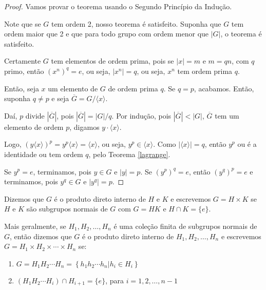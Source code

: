 	\begin{proof}
		Vamos provar o teorema usando o Segundo Princípio da Indução. 
		\par\vspace{0.3cm} Note que se $G$ tem ordem 2, nosso teorema é satisfeito. Suponha que $G$ tem ordem maior que 2 e que para todo grupo com ordem menor que $|G|$, o teorema é satisfeito. 
		\par\vspace{0.3cm} Certamente $G$ tem elementos de ordem prima, pois se $|x| = m$ e $m = qn$, com $q$ primo, então $(x^n)^q = e$, ou seja, $|x^n| = q$, ou seja, $x^n$ tem ordem prima $q$.
		\par\vspace{0.3cm} Então, seja $x$ um elemento de $G$ de ordem prima $q$. Se $q = p$, acabamos. Então, suponha $q\neq p$ e seja $\overline{G} = G/\langle x \rangle$.
		\par\vspace{0.3cm} Daí, $p$ divide $|\overline{G}|$, pois $|\overline{G}| = |G|/q$. Por indução, pois $|\overline{G}|<|G|$, $\overline{G}$ tem um elemento de ordem $p$, digamos $y\cdot\langle x \rangle$.
		\par\vspace{0.3cm} Logo, $(y\langle x \rangle)^p = y^p\langle x \rangle = \langle x\rangle$, ou seja, $y^p\in\langle x \rangle$. Como $|\langle x \rangle| = q$, então $y^p$ ou é a identidade ou tem ordem $q$, pelo Teorema \eqref{lagrange}.
		\par\vspace{0.3cm} Se $y^p = e$, terminamos, pois $y\in G$ e $|y|=p$. Se $(y^p)^q = e$, então $(y^q)^p = e$ e terminamos, pois $y^q\in G$ e $|y^q| = p$.
	\end{proof}
	
	
	\begin{deff}
		\label{def prod direto interno}
		Dizemos que $G$ é o produto direto interno de $H$ e $K$ e escrevemos $G = H\times K$ se $H$ e $K$ são subgrupos normais de $G$ com $G = HK$ e $H\cap K = \{e\}$.
		\par\vspace{0.3cm} Mais geralmente, se $H_1, H_2, \dots, H_n$ é uma coleção finita de subgrupos normais de $G$, então dizemos que $G$ é o produto direto interno de $H_1, H_2, \dots, H_n$ e escrevemos $G = H_1\times H_2\times\cdots\times H_n$ se: 
		\begin{enumerate}
			\item $G = H_1H_2\cdots H_n = \left\{ h_1h_2\cdots h_n | h_i\in H_i\right\}$
			\item $(H_1H_2\cdots H_i)\cap H_{i+1} = \{e\}$, para $i = 1, 2, \dots, n-1$
		\end{enumerate}
	\end{deff}
	

